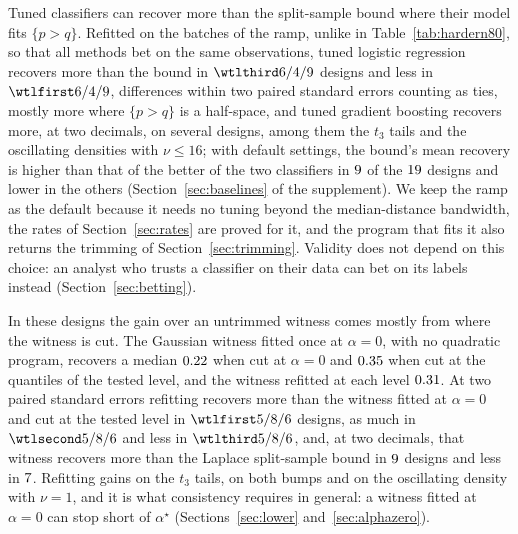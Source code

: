 Tuned classifiers can recover more than the split-sample bound where their model fits $\{p>q\}$. Refitted on the
batches of the ramp, unlike in Table~\ref{tab:hardern80}, so that all methods bet on the same observations, tuned
logistic regression recovers more than the bound in $\wtllosses{\mnWtlRecLogitTuned}$ designs and less in
$\wtlwins{\mnWtlRecLogitTuned}$, differences within two paired standard errors counting as ties, mostly more where
$\{p>q\}$ is a half-space, and tuned gradient boosting recovers more, at two decimals, on several designs, among them
the $t_3$ tails and the oscillating densities with $\nu\le16$; with default settings, the bound's mean recovery is
higher than that of the better of the two classifiers in $9$ of the $19$ designs and
lower in the others (Section~\ref{sec:baselines} of the supplement).
We keep the ramp as the default because it needs no tuning beyond the median-distance bandwidth, the rates of Section~\ref{sec:rates} are proved for it, and the program
that fits it also returns the trimming of Section~\ref{sec:trimming}. Validity does not depend on this choice: an
analyst who trusts a classifier on their data can bet on its labels instead (Section~\ref{sec:betting}).

In these designs the gain over an untrimmed witness comes mostly from where the witness is cut. The Gaussian witness
fitted once at $\alpha=0$, with no quadratic program, recovers a median $0.22$ when cut at $\alpha=0$ and
$0.35$ when cut at the quantiles of the tested level, and the witness refitted at each level
$0.31$. At two paired standard errors refitting recovers more than the witness fitted at $\alpha=0$ and cut
at the tested level in $\wtlwins{\abWtlRecRampZeroCut}$ designs, as much in $\wtlties{\abWtlRecRampZeroCut}$ and less
in $\wtllosses{\abWtlRecRampZeroCut}$, and, at two decimals, that witness recovers more than the Laplace split-sample
bound in $9$ designs and less in $7$. Refitting gains on the $t_3$ tails, on both bumps and on
the oscillating density with $\nu=1$, and it is what consistency requires in general: a witness fitted at $\alpha=0$
can stop short of $\alpha^\star$ (Sections~\ref{sec:lower} and~\ref{sec:alphazero}).

